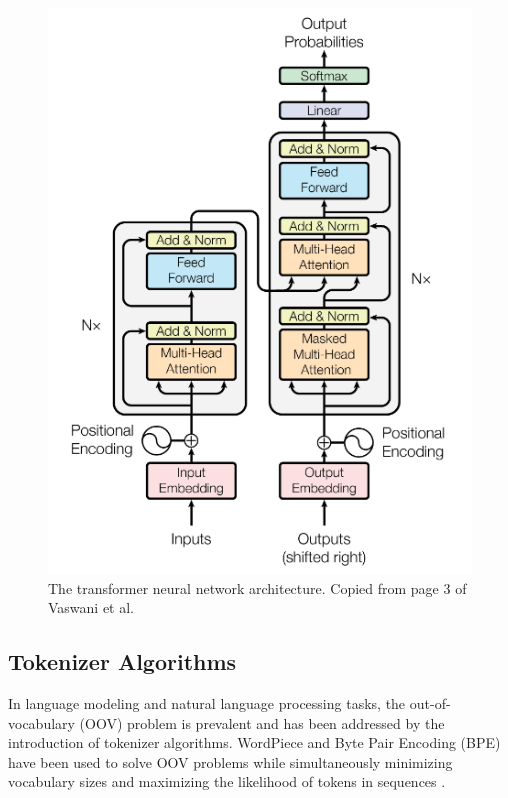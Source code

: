 \documentclass[12pt]{article}
\begin{document}
\begin{figure}[!t]
    \centering
    \includegraphics[width=0.5\linewidth]{figures/transformer_arch.png}
    \caption{The transformer neural network architecture. Copied from page 3 of Vaswani et al.~\cite[Fig. 1]{vaswani_attention_2017}}
    \label{fig:transformer_arch}
\end{figure}

\subsection{Tokenizer Algorithms}
In language modeling and natural language processing tasks, the out-of-vocabulary (OOV) problem is prevalent and has been addressed by the
introduction of tokenizer algorithms. WordPiece and Byte Pair Encoding (BPE) have been used to solve OOV problems while simultaneously minimizing
vocabulary sizes and maximizing the likelihood of tokens in sequences \cite{wu_googles_2016,schuster_japanese_2012,sennrich_neural_2016}.
\end{document}

